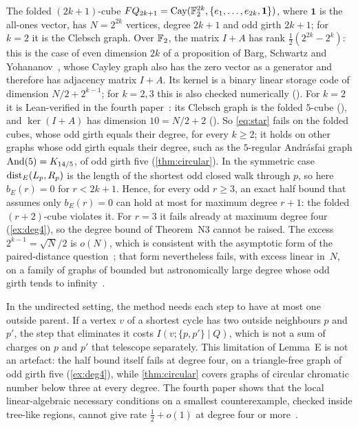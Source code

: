 \begin{remark}\label{rem:foldcube}
The folded $(2k+1)$-cube $FQ_{2k+1}=\operatorname{Cay}(\mathbb{F}_2^{2k},\{e_1,\dots,e_{2k},\mathbf 1\})$, where $\mathbf1$ is the all-ones
vector, has $N=2^{2k}$ vertices, degree $2k+1$ and odd girth $2k+1$; for $k=2$ it is the Clebsch graph. Over $\mathbb{F}_2$, the
matrix $I+A$ has rank $\frac12(2^{2k}-2^k)$: this is the case of even dimension $2k$ of a proposition of Barg,
Schwartz and Yohananov~\cite[Proposition~13]{BSY2024}, whose Cayley graph also has the zero vector as a generator and
therefore has adjacency matrix $I+A$. Its kernel is a binary linear storage code of dimension
$N/2+2^{k-1}$; for $k=2,3$ this is also checked numerically (). For $k=2$ it is
Lean-verified in the fourth paper~\cite[Corollary~6.11]{FourthPaper2026}: its Clebsch graph is the folded $5$-cube
(), and $\ker(I+A)$ has dimension $10=N/2+2$
(). So \eqref{eq:star} fails on the folded cubes, whose odd girth equals their
degree, for every $k\ge2$; it holds on other graphs whose odd girth equals their degree, such as the $5$-regular
Andrásfai graph $\operatorname{And}(5)=K_{14/5}$, of odd girth five (\cref{thm:circular}). In the symmetric case $\operatorname{dist}_E(L_p,R_p)$ is
the length of the shortest odd closed walk through $p$, so here $b_E(r)=0$ for $r<2k+1$. Hence, for every odd $r\ge3$, an exact half bound that assumes only $b_E(r)=0$ can hold at most for maximum degree
$r+1$: the folded $(r+2)$-cube violates it. For $r=3$ it fails already at maximum degree four (\cref{ex:deg4}), so the
degree bound of Theorem~N3 cannot be raised. The excess $2^{k-1}=\sqrt N/2$ is $o(N)$, which is consistent with the
asymptotic form of the paired-distance question~\cite[Question~9.1]{DirectedRecovery2026}; that form nevertheless fails,
with excess linear in~$N$, on a family of graphs of bounded but astronomically large degree whose odd girth tends to
infinity~\cite[Corollary~U]{StorageCodes2026}.
\end{remark}

\begin{remark}\label{rem:degree4}
In the undirected setting, the method needs each step to have at most one outside parent. If a vertex $v$ of a shortest
cycle has two outside neighbours $p$ and $p'$, the step that eliminates it costs $I(v;\{p,p'\}\mid Q)$, which is not a sum
of charges on $p$ and $p'$ that telescope separately. This limitation of Lemma~E is not an artefact: the half bound itself
fails at degree four, on a triangle-free graph of odd girth five (\cref{ex:deg4}), while \cref{thm:circular} covers graphs
of circular chromatic number below three at every degree. The
fourth paper shows that the local linear-algebraic necessary conditions on a smallest counterexample, checked inside
tree-like regions, cannot give rate $\frac12+o(1)$ at degree four or more~\cite[Proposition~6.28]{FourthPaper2026}.
\end{remark}

